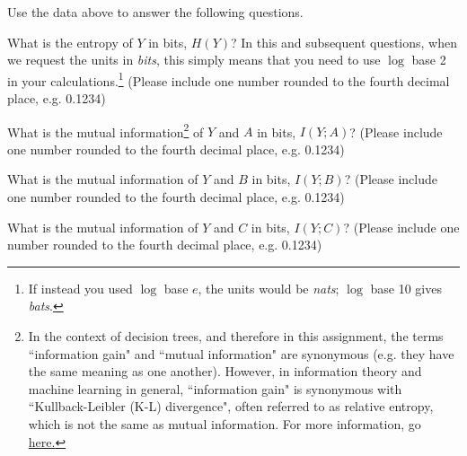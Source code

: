 Use the data above to answer the following questions. 

\begin{questions}
    \question[1] What is the entropy of $Y$ in bits, $H(Y)$? In this and subsequent questions, when we request the units in \emph{bits}, this simply means that you need to use $\log$ base 2 in your calculations.\footnote{If instead you used $\log$ base $e$, the units would be \emph{nats}; $\log$ base 10 gives \emph{bats}.}
    (Please include one number rounded to the fourth decimal place, e.g. 0.1234)
    
    \begin{tcolorbox}[fit,height=1cm, width=2cm, blank, borderline={1pt}{-2pt},nobeforeafter]
    \end{tcolorbox}
    
    
    \question[1] What is the mutual information\footnote{In the context of decision trees, and therefore in this assignment, the terms ``information gain" and ``mutual information" are synonymous (e.g. they have the same meaning as one another). However, in information theory and machine learning in general, ``information gain" is synonymous with ``Kullback-Leibler (K-L) divergence", often referred to as relative entropy, which is not the same as mutual information. For more information, go \href{https://en.wikipedia.org/wiki/Information_gain_in_decision_trees}{here.} } 
    of $Y$ and $A$ in bits, $I(Y; A)$?
    (Please include one number rounded to the fourth decimal place, e.g. 0.1234)
    
    \begin{tcolorbox}[fit,height=1cm, width=2cm, blank, borderline={1pt}{-2pt},nobeforeafter]
    \end{tcolorbox}
    

    \question[1] What is the mutual information of $Y$ and $B$ in bits, $I(Y; B)$?
    (Please include one number rounded to the fourth decimal place, e.g. 0.1234)
    
    \begin{tcolorbox}[fit,height=1cm, width=2cm, blank, borderline={1pt}{-2pt},nobeforeafter]
    \end{tcolorbox}
    
    
    \question[1] What is the mutual information of $Y$ and $C$ in bits, $I(Y; C)$?
    (Please include one number rounded to the fourth decimal place, e.g. 0.1234)
    
    \begin{tcolorbox}[fit,height=1cm, width=2cm, blank, borderline={1pt}{-2pt},nobeforeafter]
    \end{tcolorbox}
    


\end{questions}
